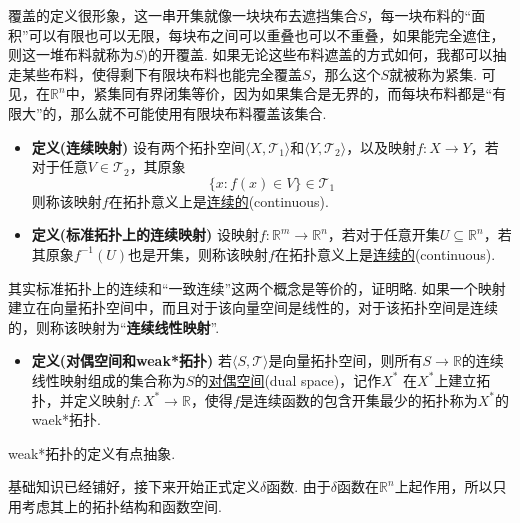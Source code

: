 覆盖的定义很形象，这一串开集就像一块块布去遮挡集合\(S\)，每一块布料的“面积”可以有限也可以无限，每块布之间可以重叠也可以不重叠，如果能完全遮住，则这一堆布料就称为\(S)\)的开覆盖. 如果无论这些布料遮盖的方式如何，我都可以抽走某些布料，使得剩下有限块布料也能完全覆盖\(S\)，那么这个\(S\)就被称为紧集. 可见，在\(\mathbb{R}^n\)中，紧集同有界闭集等价，因为如果集合是无界的，而每块布料都是“有限大”的，那么就不可能使用有限块布料覆盖该集合.

\begin{itemize}
    \item [\(\bullet\)] \textbf{定义(连续映射)}
    \newline
    设有两个拓扑空间\(\langle X, \mathcal{T}_1 \rangle\)和\(\langle Y, \mathcal{T}_2 \rangle\)，以及映射\(f:X \to Y\)，若对于任意\(V \in \mathcal{T}_2\)，其原象
    \[\{x: f(x) \in V\} \in \mathcal{T}_1\]
    则称该映射\(f\)在拓扑意义上是\uline{连续的}(continuous).
    \item [\(\bullet\)] \textbf{定义(标准拓扑上的连续映射)}
    \newline
    设映射\(f:\mathbb{R}^m \to \mathbb{R}^n\)，若对于任意开集\(U \subseteq \mathbb{R}^n\)，若其原象\(f^{-1}(U)\)也是开集，则称该映射\(f\)在拓扑意义上是\uline{连续的}(continuous).
\end{itemize}

其实标准拓扑上的连续和“一致连续”这两个概念是等价的，证明略. 如果一个映射建立在向量拓扑空间中，而且对于该向量空间是线性的，对于该拓扑空间是连续的，则称该映射为“\textbf{连续线性映射}”. 

\begin{itemize}
    \item [\(\bullet\)] \textbf{定义(对偶空间和weak*拓扑)}
    \newline
    若\(\langle S ,\mathcal{T} \rangle\)是向量拓扑空间，则所有\(S \to \mathbb{R}\)的连续线性映射组成的集合称为\(S\)的\uline{对偶空间}(dual space)，记作\(X^*\)
    \newline
    在\(X^*\)上建立拓扑，并定义映射\(f:X^* \to \mathbb{R}\)，使得\(f\)是连续函数的包含开集最少的拓扑称为\(X^*\)的waek*拓扑.
\end{itemize}

weak*拓扑的定义有点抽象. 

\vspace{1cm}

基础知识已经铺好，接下来开始正式定义\(\delta\)函数. 由于\(\delta\)函数在\(\mathbb{R}^n\)上起作用，所以只用考虑其上的拓扑结构和函数空间.

